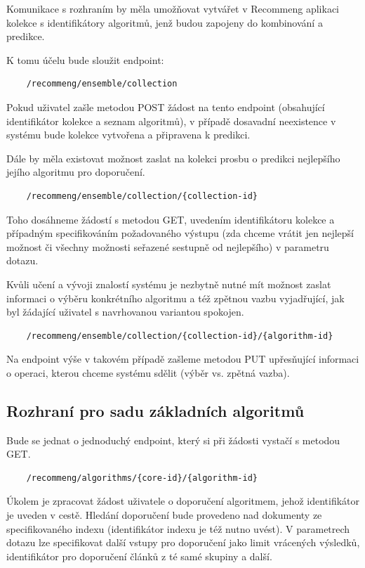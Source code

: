 \documentclass[thesis=M,czech]{FITthesis}[2014/05/07]
\begin{document}
Komunikace s rozhraním by měla umožňovat vytvářet v Recommeng aplikaci kolekce s identifikátory algoritmů, jenž budou zapojeny do kombinování a predikce. 

K tomu účelu bude sloužit endpoint:

\begin{verbatim}
	/recommeng/ensemble/collection
\end{verbatim}

Pokud uživatel zašle metodou POST žádost na tento endpoint (obsahující identifikátor kolekce a seznam algoritmů), v případě dosavadní neexistence v systému bude kolekce vytvořena a připravena k predikci. 

Dále by měla existovat možnost zaslat na kolekci prosbu o predikci nejlepšího jejího algoritmu pro doporučení.

\begin{verbatim}
	/recommeng/ensemble/collection/{collection-id}
\end{verbatim}

Toho dosáhneme žádostí s metodou GET, uvedením identifikátoru kolekce a případným specifikováním požadovaného výstupu (zda chceme vrátit jen nejlepší možnost či všechny možnosti seřazené sestupně od nejlepšího) v parametru dotazu.

Kvůli učení a vývoji znalostí systému je nezbytně nutné mít možnost zaslat informaci o výběru konkrétního algoritmu a též zpětnou vazbu vyjadřující, jak byl žádající uživatel s navrhovanou variantou spokojen.

\begin{verbatim}
	/recommeng/ensemble/collection/{collection-id}/{algorithm-id}
\end{verbatim}

Na endpoint výše v takovém případě zašleme metodou PUT upřesňující informaci o operaci, kterou chceme systému sdělit (výběr vs. zpětná vazba).

\subsection{Rozhraní pro sadu základních algoritmů}

Bude se jednat o jednoduchý endpoint, který si při žádosti vystačí s metodou GET.

\begin{verbatim}
	/recommeng/algorithms/{core-id}/{algorithm-id}
\end{verbatim}

Úkolem je zpracovat žádost uživatele o doporučení algoritmem, jehož identifikátor je uveden v cestě. Hledání doporučení bude provedeno nad dokumenty ze specifikovaného indexu (identifikátor indexu je též nutno uvést). V parametrech dotazu lze specifikovat další vstupy pro doporučení jako limit vrácených výsledků, identifikátor pro doporučení článků z té samé skupiny a další.
\end{document}
